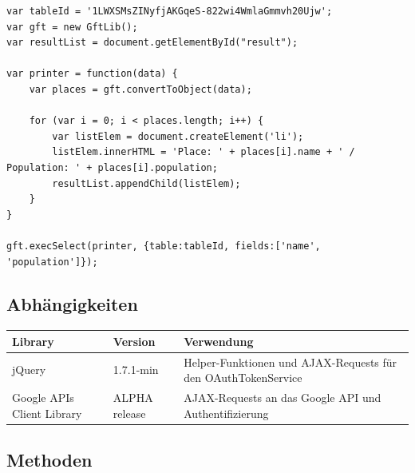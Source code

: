 \lstset{language=JavaScript}
\begin{lstlisting}[caption=Verwendung der GftLib, label=gftlib-example]
var tableId = '1LWXSMsZINyfjAKGqeS-822wi4WmlaGmmvh20Ujw';
var gft = new GftLib();
var resultList = document.getElementById("result");

var printer = function(data) {
	var places = gft.convertToObject(data);

	for (var i = 0; i < places.length; i++) {
		var listElem = document.createElement('li');
		listElem.innerHTML = 'Place: ' + places[i].name + ' / Population: ' + places[i].population;
		resultList.appendChild(listElem);
	}
}

gft.execSelect(printer, {table:tableId, fields:['name', 'population']});
\end{lstlisting}

\subsection{Abhängigkeiten}
\begin{longtable}{|p{0.3\threecelltabwidth}|p{0.2\threecelltabwidth}|p{0.5\threecelltabwidth}|}
\hline 
\textbf{Library} & \textbf{Version} & \textbf{Verwendung} \\ 
\hline 
jQuery & 1.7.1-min & Helper-Funktionen und \gls{AJAX}-Requests für den OAuthTokenService  \\ 
\hline 
Google \gls{API}s Client Library & ALPHA release & \gls{AJAX}-Requests an das Google \gls{API} und Authentifizierung \\ 
\hline 
\end{longtable} 

\subsection{Methoden}
